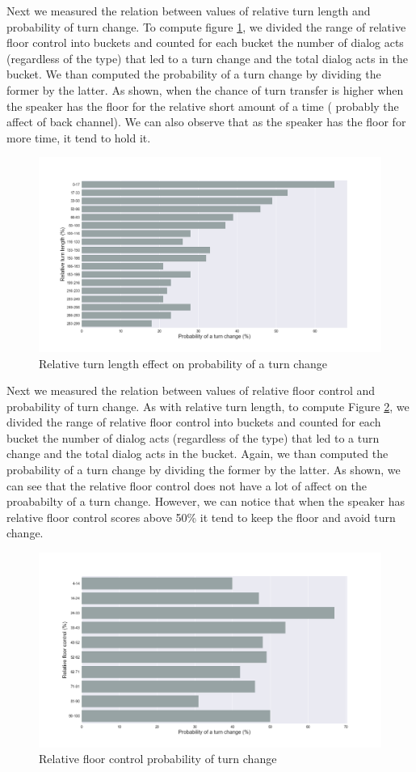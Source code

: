 Next we measured the relation between values of relative turn length and probability of turn change.
To compute figure \ref{fig:rtl:turn}, we divided the range of relative floor control into buckets and counted for each bucket the number of dialog acts (regardless of the type) that led to a turn change and the total dialog acts in the bucket.
We than computed the probability of a turn change by dividing the former by the latter. As shown, when the chance of turn transfer is higher when the speaker has the floor for the relative short amount of a time ( probably the affect of back channel). We can also observe that as the speaker has the floor for more time, it tend to hold it.


\begin{figure}[ht!]
\centering
\includegraphics[width=\textwidth]{../scikitlearn/figures/f5.png}
\caption{Relative turn length effect on probability of a turn change}
\label{fig:rtl:turn}
\end{figure}

Next we measured the relation between values of relative floor control and probability of turn change.
As with relative turn length, to compute Figure \ref{fig:rfc:turn}, we divided the range of relative floor control into buckets and counted for each bucket the number of dialog acts (regardless of the type) that led to a turn change and the total dialog acts in the bucket.
Again, we than computed the probability of a turn change by dividing the former by the latter. As shown,
we can see that the relative floor control does not have a lot of affect on the proababilty of a turn change. However, we can notice that when the speaker has relative floor control scores above 50\% it tend to keep the floor and avoid turn change.

\begin{figure}[ht!]
\centering
\includegraphics[width=\textwidth]{../scikitlearn/figures/f6.png}
\caption{Relative floor control probability of turn change}
\label{fig:rfc:turn}
\end{figure}
